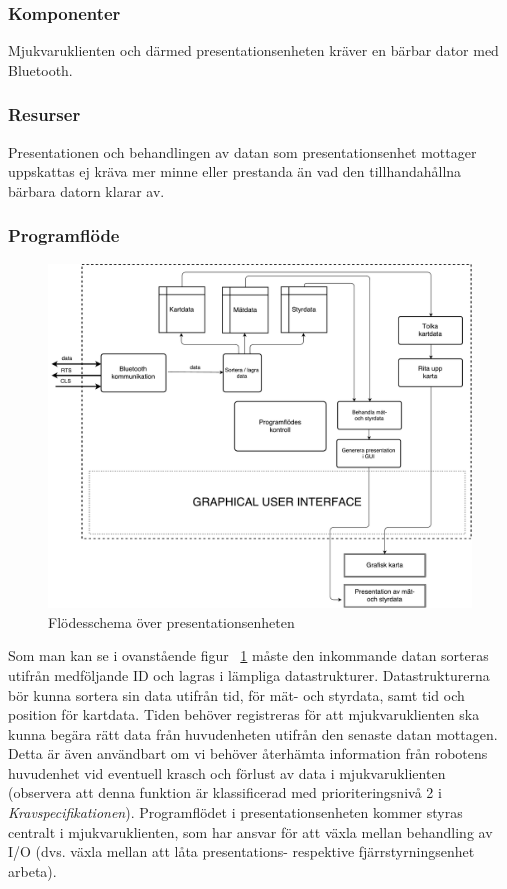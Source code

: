 \documentclass{article}
\begin{document}
\subsubsection{Komponenter}
Mjukvaruklienten och därmed presentationsenheten kräver en bärbar dator med Bluetooth. 

\subsubsection{Resurser}
Presentationen och behandlingen av datan som presentationsenhet mottager uppskattas ej kräva mer minne eller prestanda än vad den tillhandahållna bärbara datorn klarar av.

\subsubsection{Programflöde}
\begin{figure}[H]
\centering 
\includegraphics[scale=0.3]{Presentationsenhet}
\caption{Flödesschema över presentationsenheten}
\label{fig:Presentationsenhet}
\end{figure}
Som man kan se i ovanstående figur ~\ref{fig:Presentationsenhet} måste den inkommande datan sorteras utifrån medföljande ID och lagras i lämpliga datastrukturer. Datastrukturerna bör kunna sortera sin data utifrån tid, för mät- och styrdata, samt tid och position för kartdata. Tiden behöver registreras för att mjukvaruklienten ska kunna begära rätt data från huvudenheten utifrån den senaste datan mottagen. Detta är även användbart om vi behöver återhämta information från robotens huvudenhet vid eventuell krasch och förlust av data i mjukvaruklienten (observera att denna funktion är klassificerad med prioriteringsnivå 2 i \textit{Kravspecifikationen}). Programflödet i presentationsenheten kommer styras centralt i mjukvaruklienten, som har ansvar för att växla mellan behandling av I/O (dvs. växla mellan att låta presentations- respektive fjärrstyrningsenhet arbeta). 
\end{document}
